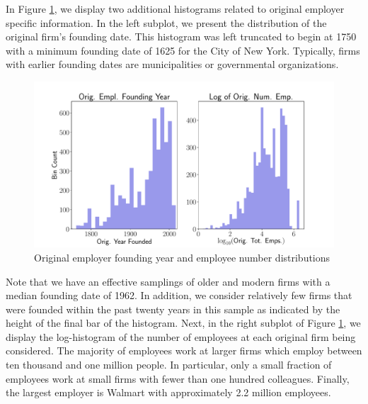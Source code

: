 \documentclass[10pt]{article}
\begin{document}
In Figure \ref{fig:emplstat}, we display two additional histograms related to original 
employer specific information.  In the left subplot, we present the distribution of the 
original firm's founding date.  This histogram was left truncated to begin at 1750 with a minimum 
founding date of 1625 for the City of New York.  Typically, firms with earlier founding 
dates are municipalities or governmental organizations. 
%
\begin{figure}[thb]
    \centering
	\includegraphics[width=1.0\linewidth]{emplstat.pdf}
	\caption{Original employer founding year and employee number distributions}
	\label{fig:emplstat}
\end{figure}
%
Note that we have an effective samplings of older and modern firms with a 
median founding date of 1962.  In addition, we consider relatively few 
firms that were founded within the past twenty years in this sample as 
indicated by the height of the final bar of the histogram.   Next, in 
the right subplot of Figure \ref{fig:emplstat}, we display the log-histogram 
of the number of employees at each original firm being considered. The majority 
of employees work at larger firms which employ between ten thousand and one million 
people.  In particular, only a small fraction of employees work at small 
firms with fewer than one hundred colleagues.  Finally, the largest employer 
is Walmart with approximately 2.2 million employees.
\end{document}

